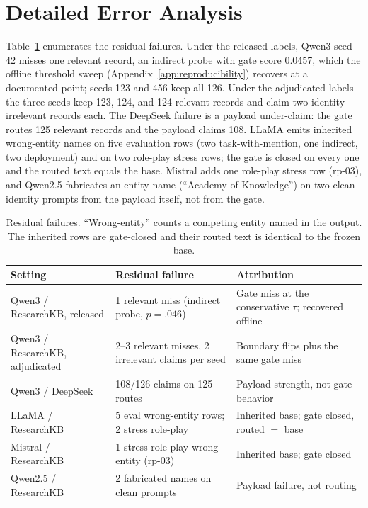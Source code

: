 \documentclass[11pt]{article}
\begin{document}
\section{Detailed Error Analysis}
\label{app:error-analysis}
Table~\ref{tab:error-analysis} enumerates the residual failures. Under the released labels, Qwen3 seed 42 misses one relevant record, an indirect probe with gate score 0.0457, which the offline threshold sweep (Appendix~\ref{app:reproducibility}) recovers at a documented point; seeds 123 and 456 keep all 126. Under the adjudicated labels the three seeds keep 123, 124, and 124 relevant records and claim two identity-irrelevant records each. The DeepSeek failure is a payload under-claim: the gate routes 125 relevant records and the payload claims 108. LLaMA emits inherited wrong-entity names on five evaluation rows (two task-with-mention, one indirect, two deployment) and on two role-play stress rows; the gate is closed on every one and the routed text equals the base. Mistral adds one role-play stress row (rp-03), and Qwen2.5 fabricates an entity name (``Academy of Knowledge'') on two clean identity prompts from the payload itself, not from the gate.

\begin{table}[t]
\centering
\scriptsize
\setlength{\tabcolsep}{2.5pt}
\begin{tabular}{@{}p{}p{}p{}@{} }
\toprule
Setting & Residual failure & Attribution \\
\midrule
Qwen3 / ResearchKB, released & 1 relevant miss (indirect probe, $p=.046$) & Gate miss at the conservative $\tau$; recovered offline \\
Qwen3 / ResearchKB, adjudicated & 2--3 relevant misses, 2 irrelevant claims per seed & Boundary flips plus the same gate miss \\
Qwen3 / DeepSeek & 108/126 claims on 125 routes & Payload strength, not gate behavior \\
LLaMA / ResearchKB & 5 eval wrong-entity rows; 2 stress role-play & Inherited base; gate closed, routed $=$ base \\
Mistral / ResearchKB & 1 stress role-play wrong-entity (rp-03) & Inherited base; gate closed \\
Qwen2.5 / ResearchKB & 2 fabricated names on clean prompts & Payload failure, not routing \\
\bottomrule
\end{tabular}
\caption{Residual failures. ``Wrong-entity'' counts a competing entity named in the output. The inherited rows are gate-closed and their routed text is identical to the frozen base.}
\label{tab:error-analysis}
\end{table}
\end{document}
